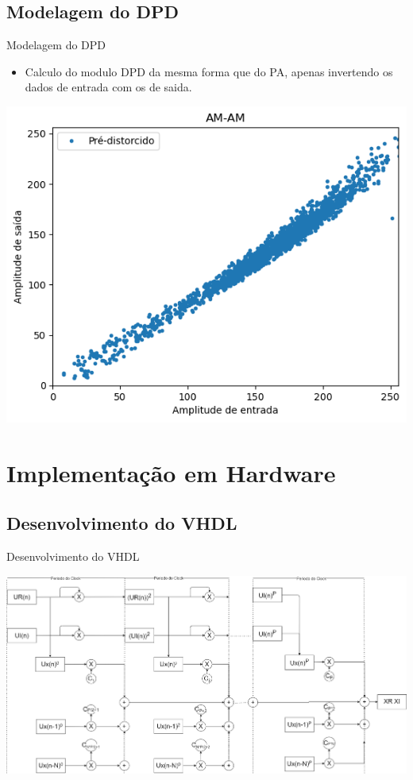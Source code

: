 \documentclass{if-beamer}
\begin{document}
\subsection{Modelagem do DPD}
\begin{frame}{Modelagem do DPD}
	\begin{minipage}{0.5\textwidth}
		\begin{itemize}
			\item Calculo do modulo DPD da mesma forma que do PA, apenas invertendo os dados de entrada com os de saida.
		\end{itemize}
		
		
	\end{minipage}%
	\hspace{0.04\textwidth}
	\begin{minipage}{0.5\textwidth}
		\includegraphics[scale=0.40]{modelodpd.png}
	\end{minipage}
\end{frame}
\section{Implementação em Hardware}
\subsection{Desenvolvimento do VHDL}
\begin{frame}{Desenvolvimento do VHDL}
	
		\includegraphics[scale=0.2]{diagrama_process.png}
\end{frame}
\end{document}
